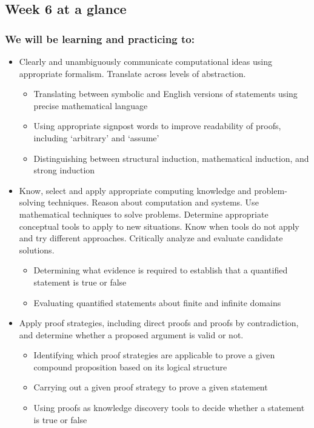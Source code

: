 \documentclass[12pt, oneside]{article}
\begin{document}
\begin{flushright}
\end{flushright} 
\subsection*{Week 6 at a glance}

\subsubsection*{We will be learning and practicing to:}
\begin{itemize}

\item Clearly and unambiguously communicate computational ideas using appropriate formalism. Translate across levels of abstraction.
\begin{itemize}
   \item Translating between symbolic and English versions of statements using precise mathematical language
    \item Using appropriate signpost words to improve readability of proofs, including `arbitrary' and `assume'
    \item Distinguishing between structural induction, mathematical induction, and strong induction
\end{itemize}

\item Know, select and apply appropriate computing knowledge and problem-solving techniques. Reason about computation and systems. Use mathematical techniques to solve problems. Determine appropriate conceptual tools to apply to new situations. Know when tools do not apply and try different approaches. Critically analyze and evaluate candidate solutions.
\begin{itemize}
    \item Determining what evidence is required to establish that a quantified statement is true or false
    \item Evaluating quantified statements about finite and infinite domains
\end{itemize}

\item Apply proof strategies, including direct proofs and proofs by contradiction, and determine whether a proposed argument is valid or not.
\begin{itemize}
    \item Identifying which proof strategies are applicable to prove a given compound proposition based on its logical structure
    \item Carrying out a given proof strategy to prove a given statement
    \item Using proofs as knowledge discovery tools to decide whether a statement is true or false
\end{itemize}


\end{itemize}
\end{document}
